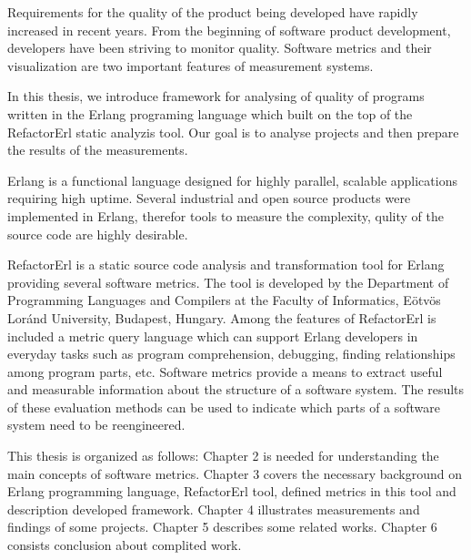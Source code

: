 Requirements for the quality of the product being developed have rapidly increased in recent years. From the beginning of software product development, developers have been striving to monitor quality. Software metrics and their visualization are two important features of measurement systems. 

In this thesis, we introduce framework for analysing of quality of programs written in the Erlang programing language which built on the top of the RefactorErl static analyzis tool. Our goal is to analyse
projects and then prepare the results of the measurements.

Erlang is a functional language designed for highly parallel, scalable applications requiring high uptime. Several industrial and open source products were implemented in Erlang, therefor tools to measure the complexity, qulity of the source code are highly desirable. 

RefactorErl is a static source code analysis and transformation tool for Erlang providing several software metrics. The tool is developed by the Department of Programming Languages and Compilers at the Faculty of Informatics, Eötvös Loránd University, Budapest, Hungary. 
Among the features of RefactorErl is included a metric query language which can support Erlang developers in everyday tasks such as program comprehension, debugging, finding relationships among program parts, etc.
Software metrics provide a means to extract useful and measurable information about the structure of a software system. The results of these evaluation methods can be used to indicate which parts of a software system need to be reengineered.

This thesis is organized as follows: Chapter 2 is needed for understanding the main concepts of software metrics. Chapter 3 covers the necessary background on Erlang programming language, RefactorErl tool, defined metrics  in this tool and description developed framework. Chapter 4 illustrates measurements and findings of some projects. Chapter 5 describes some related works. Chapter 6 consists conclusion about complited work.

